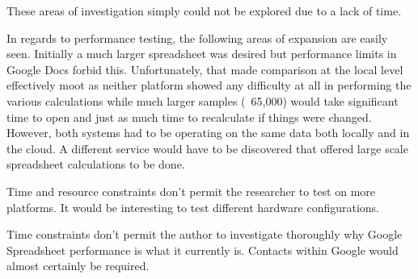 These areas of investigation simply could not be explored due to a lack of time.


In regards to performance testing, the following areas of expansion are easily
seen.  Initially a much larger spreadsheet was desired but performance limits in
Google Docs forbid this.  Unfortunately, that made comparison at the local level
effectively moot as neither platform showed any difficulty at all in performing
the various calculations while much larger samples (~65,000) would take
significant time to open and just as much time to recalculate if things were
changed.  However, both systems had to be operating on the same data both
locally and in the cloud.  A different service would have to be discovered that
offered large scale spreadsheet calculations to be done.

Time and resource constraints don't permit the researcher to test on more
platforms.  It would be interesting to test different hardware configurations.

Time constraints don't permit the author to investigate thoroughly why Google
Spreadsheet performance is what it currently is.  Contacts within Google would
almost certainly be required.
